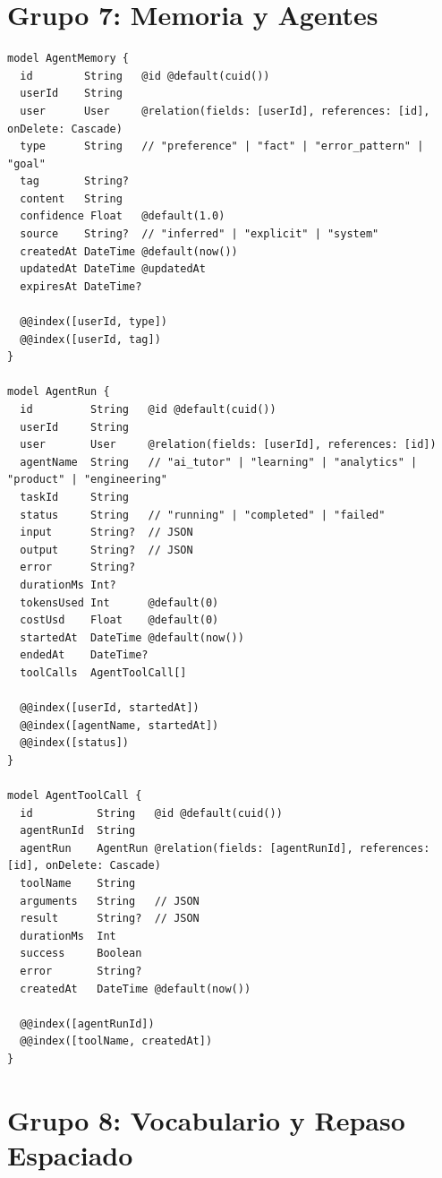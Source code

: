 \section{Grupo 7: Memoria y Agentes}

\begin{lstlisting}[style=sql,caption={Modelos de memoria y ejecución de agentes}]
model AgentMemory {
  id        String   @id @default(cuid())
  userId    String
  user      User     @relation(fields: [userId], references: [id], onDelete: Cascade)
  type      String   // "preference" | "fact" | "error_pattern" | "goal"
  tag       String?
  content   String
  confidence Float   @default(1.0)
  source    String?  // "inferred" | "explicit" | "system"
  createdAt DateTime @default(now())
  updatedAt DateTime @updatedAt
  expiresAt DateTime?

  @@index([userId, type])
  @@index([userId, tag])
}

model AgentRun {
  id         String   @id @default(cuid())
  userId     String
  user       User     @relation(fields: [userId], references: [id])
  agentName  String   // "ai_tutor" | "learning" | "analytics" | "product" | "engineering"
  taskId     String
  status     String   // "running" | "completed" | "failed"
  input      String?  // JSON
  output     String?  // JSON
  error      String?
  durationMs Int?
  tokensUsed Int      @default(0)
  costUsd    Float    @default(0)
  startedAt  DateTime @default(now())
  endedAt    DateTime?
  toolCalls  AgentToolCall[]

  @@index([userId, startedAt])
  @@index([agentName, startedAt])
  @@index([status])
}

model AgentToolCall {
  id          String   @id @default(cuid())
  agentRunId  String
  agentRun    AgentRun @relation(fields: [agentRunId], references: [id], onDelete: Cascade)
  toolName    String
  arguments   String   // JSON
  result      String?  // JSON
  durationMs  Int
  success     Boolean
  error       String?
  createdAt   DateTime @default(now())

  @@index([agentRunId])
  @@index([toolName, createdAt])
}
\end{lstlisting}

\section{Grupo 8: Vocabulario y Repaso Espaciado}

